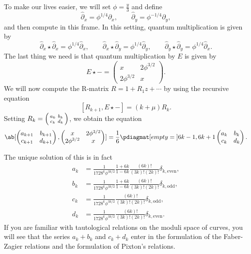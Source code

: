 To make our lives easier, we will set \(\phi = \frac{y}{3}\) and define
\[ \hat{\partial}_x = \phi^{1/4} \partial_x, \qquad \hat{\partial}_y = \phi^{-1/4} \partial_y, \]
and then compute in this frame. In this setting, quantum multiplication is given by
\[ \hat{\partial}_x \star \hat{\partial}_x = \phi^{1/4} \hat{\partial}_x, \qquad \hat{\partial}_x \star \hat{\partial}_y = \phi^{1/4} \hat{\partial}_y, \qquad \hat{\partial}_y \star \hat{\partial}_y = \phi^{1/4} \hat{\partial}_x. \]
The last thing we need is that quantum multiplication by \(E\) is given by
\[ E \star - = \begin{pmatrix}
    x & 2 \phi^{3/2} \\
    2 \phi^{3/2} & x 
\end{pmatrix}. \]
We will now compute the R-matrix \(R = 1 + R_1 z + \cdots\) by using the recursive equation
\[ [R_{k+1}, E \star -] = (k + \mu) R_k. \]
Setting \(R_k = \begin{psmallmatrix}
    a_k & b_k \\
    c_k & d_k
\end{psmallmatrix}\), we obtain the equation
\[ \ab[
    \begin{pmatrix}
        a_{k+1} & b_{k+1} \\
        c_{k+1} & d_{k+1}
    \end{pmatrix}, \begin{pmatrix}
        x & 2 \phi^{3/2} \\
        2 \phi^{3/2} & x 
    \end{pmatrix}
] = \frac{1}{6} \pdiagmat[empty={}]{6k-1, 6k+1} \begin{pmatrix}
    a_k & b_k \\
    c_k & d_k 
\end{pmatrix}. \]

The unique solution of this is in fact
\begin{align*}
    a_k &= \frac{1}{1728^k \phi^{3k/2}} \frac{1+6k}{1-6k} \frac{(6k)!}{(3k)!(2k)!} \delta_{k, \text{even}},  \\
    b_k &= \frac{1}{1728^k \phi^{3k/2}} \frac{1+6k}{1-6k}\frac{(6k)!}{(3k)!(2k)!} \delta_{k, \text{odd}},  \\
    c_k &= \frac{1}{1728^k \phi^{3k/2}}\frac{(6k)!}{(3k)!(2k)!} \delta_{k, \text{odd}}, \\
    d_k &= \frac{1}{1728^k \phi^{3k/2}} \frac{(6k)!}{(3k)!(2k)!} \delta_{k, \text{even}}. 
\end{align*}
If you are familiar with tautological relations on the moduli space of curves, you will see that the series \(a_k + b_k\) and \(c_k + d_k\) enter in the formulation of the Faber-Zagier relations and the formulation of Pixton's relations. 

